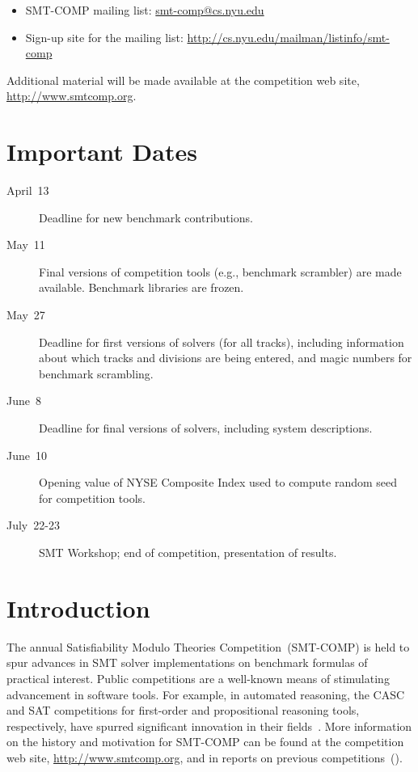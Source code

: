 \documentclass[12pt]{article}
\begin{document}
\begin{itemize}
\item SMT-COMP mailing list:
  \href{mailto:smt-comp@cs.nyu.edu}{\textrm{smt-comp@cs.nyu.edu}}
\item Sign-up site for the mailing list:
  \url{http://cs.nyu.edu/mailman/listinfo/smt-comp}
\end{itemize}

\noindent Additional material will be made available at the
competition web site, \url{http://www.smtcomp.org}.


\newpage

\section{Important Dates}
\label{sec:important}

\begin{description}
\item[April~13] Deadline for new benchmark contributions.
\item[May~11] Final versions of competition tools (e.g., benchmark
  scrambler) are made available.  Benchmark libraries are frozen.
\item[May~27] Deadline for first versions of solvers (for all tracks),
  including information about which tracks and divisions are being
  entered, and magic numbers for benchmark scrambling.
\item[June~8] Deadline for final versions of solvers, including
  system descriptions.
\item[June~10] Opening value of NYSE Composite Index used to compute
  random seed for competition tools.
\item[July~22-23] SMT Workshop; end of competition, presentation of
  results.
\end{description}


\section{Introduction}

The annual Satisfiability Modulo Theories Competition~(SMT-COMP) is
held to spur advances in SMT solver implementations on benchmark
formulas of practical interest.  Public competitions are a well-known
means of stimulating advancement in software tools.  For example, in
automated reasoning, the CASC and SAT competitions for first-order and
propositional reasoning tools, respectively, have spurred significant
innovation in their fields~\cite{leberre+03,PSS02}.  More information
on the history and motivation for SMT-COMP can be found at the
competition web site, \url{http://www.smtcomp.org}, and in reports on
previous
competitions~(\cite{SMTCOMP-JAR,SMTCOMP-FMSD,BDOS08,SMTCOMP-2008,CDW14,SMTCOMP-2012,CSW15}).
\end{document}
